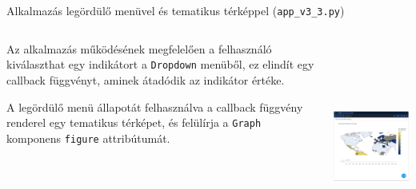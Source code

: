 \documentclass[english, aspectratio=169]{beamer}
\begin{document}
\begin{frame}[fragile]{Alkalmazás legördülő menüvel és tematikus térképpel (\texttt{app\_v3\_3.py})}
	\begin{columns}
		\begin{column}{.5\textwidth}
			Az alkalmazás működésének megfelelően a felhasználó kiválaszthat egy indikátort a \texttt{Dropdown} menüből, ez elindít egy callback függvényt, aminek átadódik az indikátor értéke.\par\smallskip
			A legördülő menü állapotát felhasználva a callback függvény renderel egy tematikus térképet, és felülírja a \texttt{Graph} komponens \texttt{figure} attribútumát.
		\end{column}
		\begin{column}{.5\textwidth}
			\begin{center}
				\includegraphics[width=7cm, height=7cm, keepaspectratio]{images/scatter_23.png}
			\end{center}
		\end{column}
	\end{columns}
\end{frame}
\end{document}

